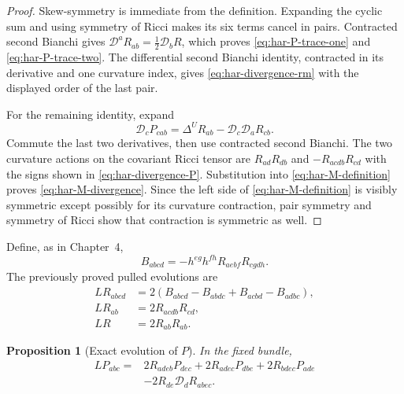 \documentclass[10pt]{coll-l}
\newtheorem{proposition}[theorem]{Proposition}
\theoremstyle{definition}
\theoremstyle{remark}
\numberwithin{section}{chapter}
\numberwithin{equation}{chapter}
\begin{document}
\begin{proof}
Skew-symmetry is immediate from the definition.  Expanding the cyclic sum
and using symmetry of Ricci makes its six terms cancel in pairs.  Contracted
second Bianchi gives $\mathcal D^aR_{ab}=\frac12\mathcal D_bR$, which proves
\eqref{eq:har-P-trace-one} and \eqref{eq:har-P-trace-two}.  The differential
second Bianchi identity, contracted in its derivative and one curvature
index, gives \eqref{eq:har-divergence-rm} with the displayed order of the
last pair.

For the remaining identity, expand
\[
 \mathcal D_cP_{cab}
   =\Delta^UR_{ab}-\mathcal D_c\mathcal D_aR_{cb}.
\]
Commute the last two derivatives, then use contracted second Bianchi.  The
two curvature actions on the covariant Ricci tensor are
$R_{ad}R_{db}$ and $-R_{acdb}R_{cd}$ with the signs shown in
\eqref{eq:har-divergence-P}.  Substitution into
\eqref{eq:har-M-definition} proves \eqref{eq:har-M-divergence}.  Since the
left side of \eqref{eq:har-M-definition} is visibly symmetric except
possibly for its curvature contraction, pair symmetry and symmetry of
Ricci show that contraction is symmetric as well.
\end{proof}

Define, as in Chapter~4,
\begin{equation}
 B_{abcd}=-h^{eg}h^{fh}R_{aebf}R_{cgdh}.                 \label{eq:har-B-definition}
\end{equation}
The previously proved pulled evolutions are
\begin{align}
 LR_{abcd}
   &=2(B_{abcd}-B_{abdc}+B_{acbd}-B_{adbc}),             \label{eq:har-Rm-evolution}\\
 LR_{ab}&=2R_{acdb}R_{cd},                               \label{eq:har-Ric-evolution}\\
 LR&=2R_{ab}R_{ab}.                                      \label{eq:har-scalar-evolution}
\end{align}

\begin{proposition}[Exact evolution of $P$]
\label{prop:har-P-evolution}
In the fixed bundle,
\begin{equation}
 \begin{split}
 LP_{abc}={}&2R_{adeb}P_{dec}+2R_{adec}P_{dbe}
              +2R_{bdec}P_{ade}\\
            &-2R_{de}\mathcal D_dR_{abec}.
                                                               \label{eq:har-P-evolution}
 \end{split}
\end{equation}
\end{proposition}
\end{document}
